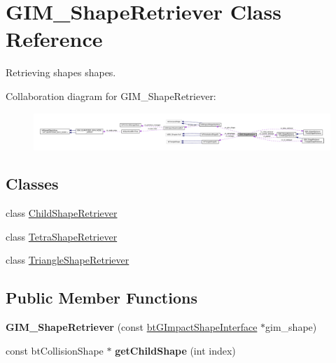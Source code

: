 \hypertarget{classGIM__ShapeRetriever}{}\section{G\+I\+M\+\_\+\+Shape\+Retriever Class Reference}
\label{classGIM__ShapeRetriever}


Retrieving shapes shapes.  




Collaboration diagram for G\+I\+M\+\_\+\+Shape\+Retriever\+:
\nopagebreak
\begin{figure}[H]
\begin{center}
\leavevmode
\includegraphics[width=350pt]{classGIM__ShapeRetriever__coll__graph}
\end{center}
\end{figure}
\subsection*{Classes}
\begin{DoxyCompactItemize}
\item 
class \hyperlink{classGIM__ShapeRetriever_1_1ChildShapeRetriever}{Child\+Shape\+Retriever}
\item 
class \hyperlink{classGIM__ShapeRetriever_1_1TetraShapeRetriever}{Tetra\+Shape\+Retriever}
\item 
class \hyperlink{classGIM__ShapeRetriever_1_1TriangleShapeRetriever}{Triangle\+Shape\+Retriever}
\end{DoxyCompactItemize}
\subsection*{Public Member Functions}
\begin{DoxyCompactItemize}
\item 
\mbox{\label{classGIM__ShapeRetriever_a1bf36a91ca47d07983c45c35cf398ebc}} 
{\bfseries G\+I\+M\+\_\+\+Shape\+Retriever} (const \hyperlink{classbtGImpactShapeInterface}{bt\+G\+Impact\+Shape\+Interface} $\ast$gim\+\_\+shape)
\item 
\mbox{\label{classGIM__ShapeRetriever_a83751e415bbb4c24f608ea786b7ddb6e}} 
const bt\+Collision\+Shape $\ast$ {\bfseries get\+Child\+Shape} (int index)
\end{DoxyCompactItemize}
